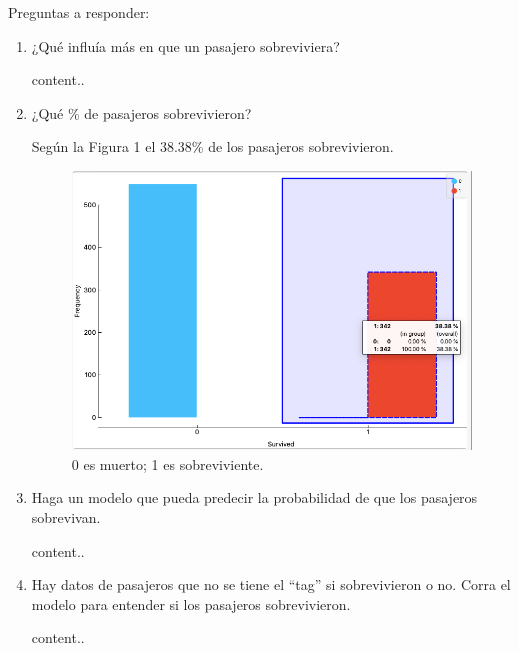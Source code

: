 





Preguntas a responder: 

\begin{enumerate}
	\item¿Qué influía más en que un pasajero sobreviviera?
	\begin{sol}
		content..
	\end{sol}
	\item ¿Qué \% de pasajeros sobrevivieron?
	\begin{sol}
		Según la Figura 1 el 38.38\% de los pasajeros sobrevivieron. 
\begin{figure}[h]
	\includegraphics[scale=0.4]{images/1}
	\centering 
	\caption{0 es muerto; 1 es sobreviviente.}
\end{figure}
	\end{sol}
	\item Haga un modelo que pueda predecir la probabilidad de que los pasajeros sobrevivan.
	\begin{sol}
		content..
	\end{sol}
	\item Hay datos de pasajeros que no se tiene el “tag” si sobrevivieron o no. Corra el modelo para entender si los pasajeros sobrevivieron.
	\begin{sol}
		content..
	\end{sol}
\end{enumerate}

%
%

